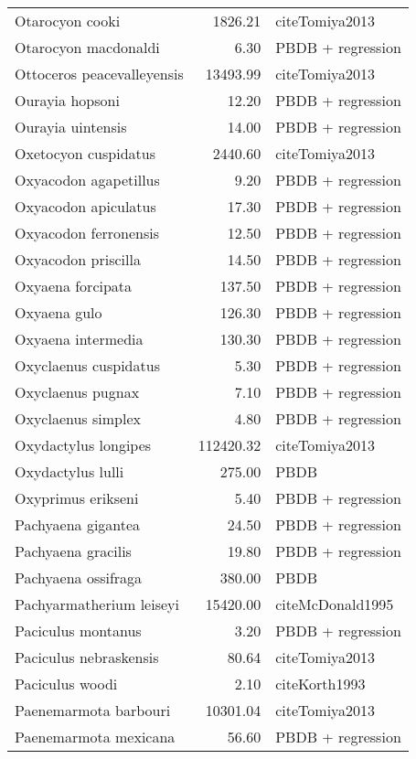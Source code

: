 \begin{table}[ht]
\begin{tabular}{lrl}
  Otarocyon cooki & 1826.21 & cite{Tomiya2013} \\ 
  Otarocyon macdonaldi & 6.30 & PBDB + regression \\ 
  Ottoceros peacevalleyensis & 13493.99 & cite{Tomiya2013} \\ 
  Ourayia hopsoni & 12.20 & PBDB + regression \\ 
  Ourayia uintensis & 14.00 & PBDB + regression \\ 
  Oxetocyon cuspidatus & 2440.60 & cite{Tomiya2013} \\ 
  Oxyacodon agapetillus & 9.20 & PBDB + regression \\ 
  Oxyacodon apiculatus & 17.30 & PBDB + regression \\ 
  Oxyacodon ferronensis & 12.50 & PBDB + regression \\ 
  Oxyacodon priscilla & 14.50 & PBDB + regression \\ 
  Oxyaena forcipata & 137.50 & PBDB + regression \\ 
  Oxyaena gulo & 126.30 & PBDB + regression \\ 
  Oxyaena intermedia & 130.30 & PBDB + regression \\ 
  Oxyclaenus cuspidatus & 5.30 & PBDB + regression \\ 
  Oxyclaenus pugnax & 7.10 & PBDB + regression \\ 
  Oxyclaenus simplex & 4.80 & PBDB + regression \\ 
  Oxydactylus longipes & 112420.32 & cite{Tomiya2013} \\ 
  Oxydactylus lulli & 275.00 & PBDB \\ 
  Oxyprimus erikseni & 5.40 & PBDB + regression \\ 
  Pachyaena gigantea & 24.50 & PBDB + regression \\ 
  Pachyaena gracilis & 19.80 & PBDB + regression \\ 
  Pachyaena ossifraga & 380.00 & PBDB \\ 
  Pachyarmatherium leiseyi & 15420.00 & cite{McDonald1995} \\ 
  Paciculus montanus & 3.20 & PBDB + regression \\ 
  Paciculus nebraskensis & 80.64 & cite{Tomiya2013} \\ 
  Paciculus woodi & 2.10 & cite{Korth1993} \\ 
  Paenemarmota barbouri & 10301.04 & cite{Tomiya2013} \\ 
  Paenemarmota mexicana & 56.60 & PBDB + regression \\ 

\end{tabular}
\end{table}
